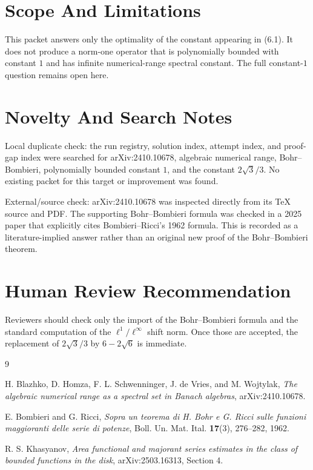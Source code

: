 \documentclass[11pt]{article}
\begin{document}
\section*{Scope And Limitations}

This packet answers only the optimality of the constant appearing in (6.1).
It does not produce a norm-one operator that is polynomially bounded with
constant \(1\) and has infinite numerical-range spectral constant.  The full
constant-\(1\) question remains open here.

\section*{Novelty And Search Notes}

Local duplicate check: the run registry, solution index, attempt index, and
proof-gap index were searched for arXiv:2410.10678, algebraic numerical range,
Bohr--Bombieri, polynomially bounded constant \(1\), and the constant
\(2\sqrt3/3\).  No existing packet for this target or improvement was found.

External/source check: arXiv:2410.10678 was inspected directly from its TeX
source and PDF.  The supporting Bohr--Bombieri formula was checked in a 2025
paper that explicitly cites Bombieri--Ricci's 1962 formula.  This is recorded
as a literature-implied answer rather than an original new proof of the
Bohr--Bombieri theorem.

\section*{Human Review Recommendation}

Reviewers should check only the import of the Bohr--Bombieri formula and the
standard computation of the \(\ell^1/\ell^\infty\) shift norm.  Once those are
accepted, the replacement of \(2\sqrt3/3\) by \(6-2\sqrt6\) is immediate.

\begin{thebibliography}{9}

H. Blazhko, D. Homza, F. L. Schwenninger, J. de Vries, and M. Wojtylak,
\emph{The algebraic numerical range as a spectral set in Banach algebras},
arXiv:2410.10678.

E. Bombieri and G. Ricci,
\emph{Sopra un teorema di H. Bohr e G. Ricci sulle funzioni maggioranti delle
serie di potenze},
Boll. Un. Mat. Ital. \textbf{17}(3), 276--282, 1962.

R. S. Khasyanov,
\emph{Area functional and majorant series estimates in the class of bounded
functions in the disk},
arXiv:2503.16313, Section 4.

\end{thebibliography}
\end{document}
